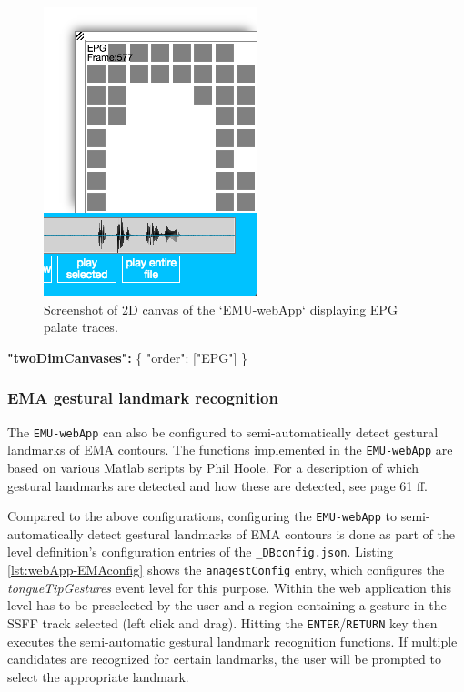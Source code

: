 \documentclass[]{book}
\newenvironment{Shaded}{\begin{snugshade}}{\end{snugshade}}
\newcommand{\DataTypeTok}[1]{\textcolor[rgb]{0.13,0.29,0.53}{#1}}
\newcommand{\ErrorTok}[1]{\textcolor[rgb]{0.64,0.00,0.00}{\textbf{#1}}}
\newcommand{\FunctionTok}[1]{\textcolor[rgb]{0.00,0.00,0.00}{#1}}
\newcommand{\OtherTok}[1]{\textcolor[rgb]{0.56,0.35,0.01}{#1}}
\newcommand{\StringTok}[1]{\textcolor[rgb]{0.31,0.60,0.02}{#1}}
\theoremstyle{definition}
\theoremstyle{definition}
\theoremstyle{definition}
\theoremstyle{remark}
\begin{document}
\begin{figure}

{\centering \includegraphics[width=0.35\linewidth]{pics/emu-webApp2dEPG} 

}

\caption{Screenshot of 2D canvas of the `EMU-webApp` displaying EPG palate traces.}\label{fig:webApp-2dEPG}
\end{figure}

\begin{Shaded}
\begin{Highlighting}[]
\ErrorTok{"twoDimCanvases":} \FunctionTok{\{}
    \DataTypeTok{"order"}\FunctionTok{:} \OtherTok{[}\StringTok{"EPG"}\OtherTok{]}
\FunctionTok{\}}
\end{Highlighting}
\end{Shaded}

\hypertarget{ema-gestural-landmark-recognition}{%
\subsubsection{EMA gestural landmark
recognition}\label{ema-gestural-landmark-recognition}}

The \texttt{EMU-webApp} can also be configured to semi-automatically
detect gestural landmarks of EMA contours. The functions implemented in
the \texttt{EMU-webApp} are based on various Matlab scripts by Phil
Hoole. For a description of which gestural landmarks are detected and
how these are detected, see \citet{bombien:2011aa} page 61 ff.

Compared to the above configurations, configuring the
\texttt{EMU-webApp} to semi-automatically detect gestural landmarks of
EMA contours is done as part of the level definition's configuration
entries of the \texttt{\_DBconfig.json}. Listing
\ref{lst:webApp-EMAconfig} shows the \texttt{anagestConfig} entry, which
configures the \emph{tongueTipGestures} event level for this purpose.
Within the web application this level has to be preselected by the user
and a region containing a gesture in the SSFF track selected (left click
and drag). Hitting the \texttt{ENTER}/\texttt{RETURN} key then executes
the semi-automatic gestural landmark recognition functions. If multiple
candidates are recognized for certain landmarks, the user will be
prompted to select the appropriate landmark.
\end{document}
